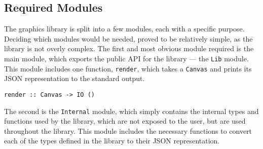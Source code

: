 \documentclass[../main.tex]{subfiles}
\begin{document}
        \subsection{Required Modules}
            The graphics library is split into a few modules, each with a specific purpose.
            Deciding which modules would be needed, proved to be relatively simple, as the
                library is not overly complex.
            The first and most obvious module required is the main module, which exports
                the public API for the library — the \texttt{Lib} module.
            This module includes one function, \texttt{render}, which takes a
                \texttt{Canvas} and prints its JSON representation to the standard output.

            \begin{lstlisting}[label={lst:lib}, caption={The \texttt{render} function.}]
render :: Canvas -> IO ()\end{lstlisting}

            The second is the \texttt{Internal} module, which simply contains the internal
                types and functions used by the library, which are not exposed to the user, but
                are used throughout the library.
            This module includes the necessary functions to convert each of the types
                defined in the library to their JSON representation.
\end{document}
